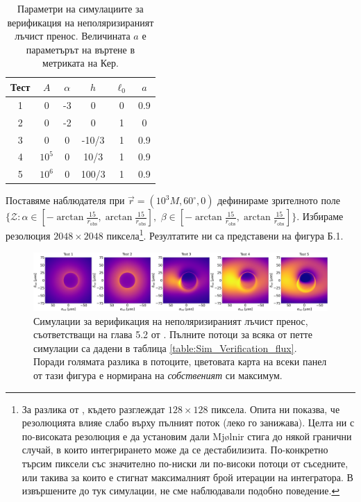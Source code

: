 \begin{appendices}
\begin{table}[h!]
	\centering
	\begin{tabular}{c|c|c|c|c|c}
		\hline
		{Тест} & {$A$}&{$\alpha$} & {$h$} & {$\ell_0$} & {$a$}
		\\\hline\hline
		1 & 0 & -3 & 0 & 0 &  0.9
		\\
		2 & 0 & -2 & 0 & 1 & 0
		\\
		3 & 0 & 0& -10/3& 1 & 0.9
		\\
		4 & $10^5$ & 0 & 10/3& 1 & 0.9
		\\ 
		5 & $10^6$ & 0 & 100/3& 1 & 0.9
		\\\hline\hline
	\end{tabular}
	\caption[Параметри на симулациите за верификация на неполяризираният лъчист пренос.]{\small Параметри на симулациите за верификация на неполяризираният лъчист пренос. Величината $a$ е параметърът на въртене в метриката на Кер.}
	\label{table:Sim_Verification}
\end{table}

Поставяме наблюдателя при $\vec{r} = (10^3M, 60^\circ, 0)$ дефинираме зрителното поле $\{\mathcal{Z}: \alpha\in[-\arctan\frac{15}{r_{\text{obs}}}, \arctan\frac{15}{r_{\text{obs}}}],\,\, \beta\in[-\arctan\frac{15}{r_{\text{obs}}}, \arctan\frac{15}{r_{\text{obs}}}]\}$. Избираме резолюция $2048\times2048$ пиксела\footnote{За разлика от \cite{Gold2020}, където разглеждат $128\times 128$ пиксела. Опита ни показва, че резолюцията влияе слабо върху пълният поток (леко го занижава). Целта ни с по-високата резолюция е да установим дали Mjølnir стига до някой гранични случай, в които интегрирането може да се дестабилизита. По-конкретно търсим пиксели със значително по-ниски ли по-високи потоци от съседните, или такива за които е стигнат максималният брой итерации на интегратора. В извършените до тук симулации, не сме наблюдавали подобно поведение.}. Резултатите ни са представени на фигура Б.1.\\

\begin{figure}[h!]
	\centering
	\includegraphics[scale = 0.15]{Verification_sims.png}

	\label{Verification_sims}
	\caption[Симулации за верификация на неполяризираният лъчист пренос]{\small Симулации за верификация на неполяризираният лъчист пренос, съответстващи на глава 5.2 от \cite{Gold2020}. Пълните потоци за всяка от петте симулации са дадени в таблица \ref{table:Sim_Verification_flux}. Поради голямата разлика в потоците, цветовата карта на всеки панел от тази фигура е нормирана на \emph{собственият} си максимум.} 
\end{figure}


\end{appendices}
